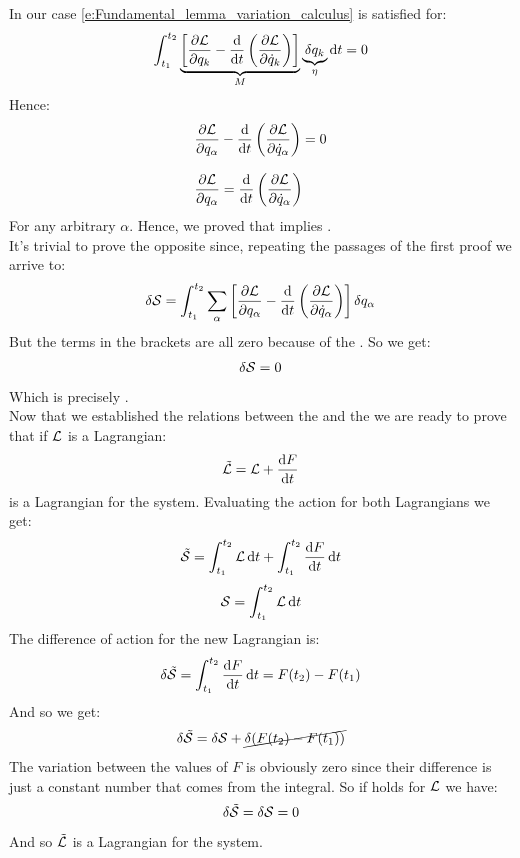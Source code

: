 In our case \eqref{e:Fundamental_lemma_variation_calculus} is satisfied for:
\begin{equation}
    \int_{t_1}^{t_2}\underbrace{\sqbr{\dfrac{\partial \lagr}{\partial q_{k}} - \dv{}{t}\brackets{\dfrac{\partial \lagr}{\partial \dot{q}_{k}}}}}_{M} \underbrace{\delta q_{k}}_{\eta} \dd{t} = 0
\end{equation}
Hence:
\begin{equation}
    \begin{split}
      &\pdv{\lagr}{q_{\alpha}} - \dv{}{t}\brackets{\pdv{\lagr}{\dot{q}_{\alpha}}} = 0 \\[8pt]
      &\pdv{\lagr}{q_{\alpha}} = \dv{}{t}\brackets{\pdv{\lagr}{\dot{q}_{\alpha}}}
    \end{split}
\end{equation}
For any arbitrary $\alpha$. Hence, we proved that \hpquotemath\;implies \eleref.\\
It's trivial to prove the opposite since, repeating the passages of the first proof we arrive to:
\begin{equation}
    \delta \action = \int_{t_1}^{t_2}\bigsum_{\alpha}\sqbr{\pdv{\lagr}{q_{\alpha}} - \dv{}{t}\brackets{\pdv{\lagr}{\dot{q}_{\alpha}}}} \delta q_{\alpha}
\end{equation}
But the terms in the brackets are all zero because of the \eleref. So we get:
\begin{equation}
    \delta \mathcal{S} = 0
\end{equation}
Which is precisely \hpquotemath.\\
Now that we established the relations between the \eleref\;and the \hpquotemath\;we are ready to prove that if $\mathcal{L}$ is a Lagrangian:
\begin{equation}
    \tilde{\mathcal{L}} = \mathcal{L} + \dfrac{\dd{F}}{\dd{t}}
\end{equation}
is a Lagrangian for the system. Evaluating the action for both Lagrangians we get:
\begin{equation}
    \tilde{\mathcal{S}} = \int_{t_1}^{t_2}\mathcal{L} \dd{t} + \int_{t_1}^{t_2}\dfrac{\dd{F}}{\dd{t}} \dd{t}
\end{equation}
\begin{equation}
    \mathcal{S} = \int_{t_1}^{t_2}\mathcal{L} \dd{t}
\end{equation}
The difference of action for the new Lagrangian is:
\begin{equation}
    \delta \tilde{\mathcal{S}} = \int_{t_1}^{t_2}\dfrac{\dd{F}}{\dd{t}} \dd{t} = F(t_2) - F(t_1)
\end{equation}
And so we get:
\begin{equation}
    \delta \tilde{\mathcal{S}} = \delta \mathcal{S} + \cancel{\delta(F(t_2) - F(t_1))}
\end{equation}
The variation between the values of $F$ is obviously zero since their difference is just a constant number that comes from the integral. So if \hpquotemath\;holds for $\mathcal{L}$ we have:
\begin{equation}
    \delta \tilde{\mathcal{S}} = \delta \mathcal{S} = 0
\end{equation}
And so $\tilde{\mathcal{L}}$ is a Lagrangian for the system.\\
